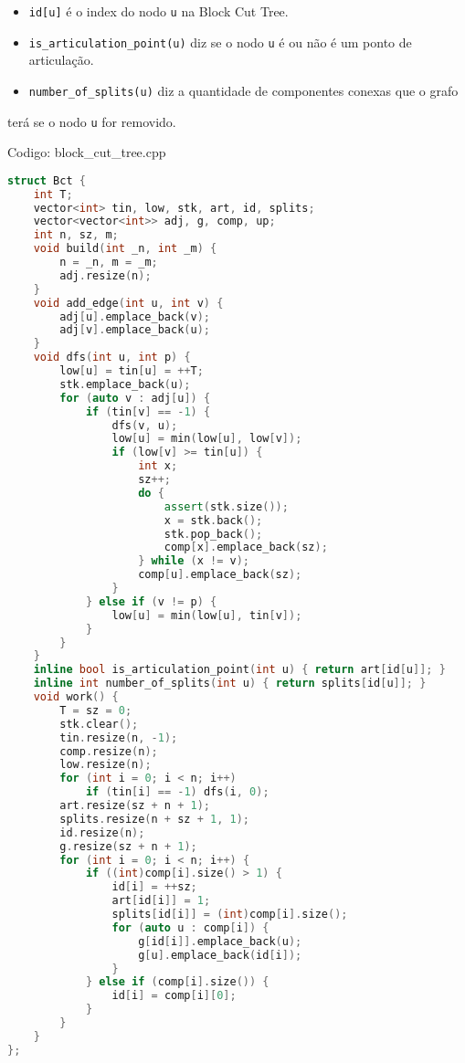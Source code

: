 \documentclass[10pt, a4paper, oneside]{book}
\begin{document}
\begin{itemize}
\item \texttt{id[u]} é o index do nodo \texttt{u} na Block Cut Tree.
\item \texttt{is\_articulation\_point(u)} diz se o nodo \texttt{u} é ou não é um ponto de articulação.
\item \texttt{number\_of\_splits(u)} diz a quantidade de componentes conexas que o grafo
\end{itemize}

    terá se o nodo \texttt{u} for removido.

\hfill

Codigo: block\_cut\_tree.cpp

\begin{lstlisting}[language=C++]
struct Bct {
    int T;
    vector<int> tin, low, stk, art, id, splits;
    vector<vector<int>> adj, g, comp, up;
    int n, sz, m;
    void build(int _n, int _m) {
        n = _n, m = _m;
        adj.resize(n);
    }
    void add_edge(int u, int v) {
        adj[u].emplace_back(v);
        adj[v].emplace_back(u);
    }
    void dfs(int u, int p) {
        low[u] = tin[u] = ++T;
        stk.emplace_back(u);
        for (auto v : adj[u]) {
            if (tin[v] == -1) {
                dfs(v, u);
                low[u] = min(low[u], low[v]);
                if (low[v] >= tin[u]) {
                    int x;
                    sz++;
                    do {
                        assert(stk.size());
                        x = stk.back();
                        stk.pop_back();
                        comp[x].emplace_back(sz);
                    } while (x != v);
                    comp[u].emplace_back(sz);
                }
            } else if (v != p) {
                low[u] = min(low[u], tin[v]);
            }
        }
    }
    inline bool is_articulation_point(int u) { return art[id[u]]; }
    inline int number_of_splits(int u) { return splits[id[u]]; }
    void work() {
        T = sz = 0;
        stk.clear();
        tin.resize(n, -1);
        comp.resize(n);
        low.resize(n);
        for (int i = 0; i < n; i++)
            if (tin[i] == -1) dfs(i, 0);
        art.resize(sz + n + 1);
        splits.resize(n + sz + 1, 1);
        id.resize(n);
        g.resize(sz + n + 1);
        for (int i = 0; i < n; i++) {
            if ((int)comp[i].size() > 1) {
                id[i] = ++sz;
                art[id[i]] = 1;
                splits[id[i]] = (int)comp[i].size();
                for (auto u : comp[i]) {
                    g[id[i]].emplace_back(u);
                    g[u].emplace_back(id[i]);
                }
            } else if (comp[i].size()) {
                id[i] = comp[i][0];
            }
        }
    }
};
\end{lstlisting}
\hfill
\end{document}
